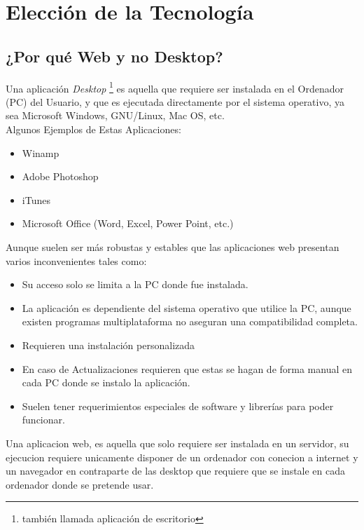 ﻿\chapter{Elección de la Tecnología}

\section{¿Por qué Web y no Desktop?}

Una aplicación \textit{Desktop} \footnote{también llamada aplicación de escritorio} es aquella que requiere ser instalada en el Ordenador (PC) del Usuario, y que es ejecutada directamente por el sistema operativo, ya sea Microsoft Windows, GNU/Linux, Mac OS, etc.\\[0.1cm]

Algunos Ejemplos de Estas Aplicaciones:

\begin{itemize}
    \item Winamp
    \item Adobe Photoshop
    \item iTunes
    \item Microsoft Office (Word, Excel, Power Point, etc.)
\end{itemize}

Aunque suelen ser más robustas y estables que las aplicaciones web presentan varios inconvenientes tales como:

\begin{itemize}
    \item Su acceso solo se limita a la PC donde fue instalada.
    \item La aplicación es dependiente del sistema operativo que utilice la PC, aunque existen programas multiplataforma no aseguran una compatibilidad completa.
    \item Requieren una instalación personalizada
    \item En caso de Actualizaciones requieren que estas se hagan de forma manual en cada PC  donde se instalo la aplicación.
    \item Suelen tener requerimientos especiales de software y librerías para poder funcionar.
\end{itemize}


Una aplicacion web, es aquella que solo requiere ser instalada en un servidor, su ejecucion requiere unicamente disponer de un ordenador con conecion a internet y un navegador en contraparte de las desktop que requiere que se instale en cada ordenador donde se pretende usar.

